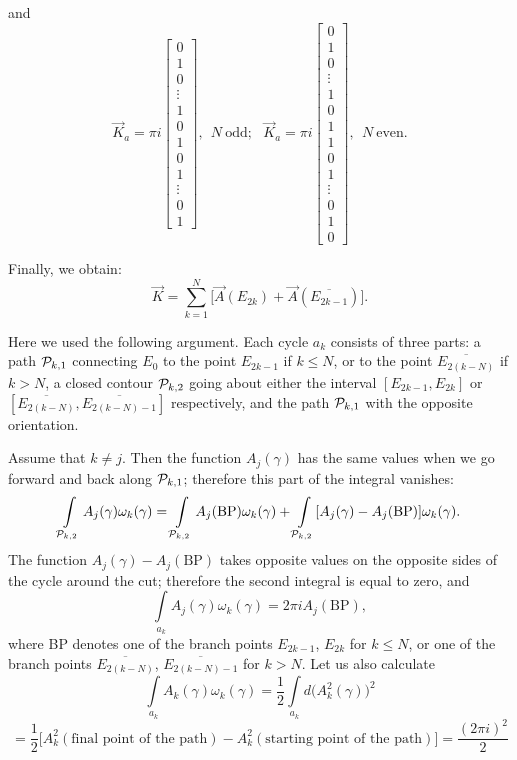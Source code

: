 \documentclass[12pt]{article}
\begin{document}
and
$$
\vec K_a =\pi i\left[\begin{array}{c} 0 \\ 1 \\ 0 \\ \vdots \\ 1 \\ 0 \\ \hline  
1 \\ 0 \\ 1  \\ \vdots\\ 0 \\ 1  \end{array}\right], \ \ 
N \ \mbox{odd}; \ \ \ 
\vec K_a =\pi i \left[\begin{array}{c} 0 \\ 1 \\ 0 \\ \vdots \\ 1 \\ 0 \\ 1 \\ \hline 
1 \\ 0 \\ 1 \\ \vdots \\0 \\ 1 \\ 0 \end{array}\right], \ \ 
N \ \mbox{even}. 
$$

Finally, we obtain:
\begin{equation}
\label{eq:vec_K}
\vec K = \sum\limits_{k=1}^N \big[ \vec A(E_{2k})+  \vec A(\overline{E_{2k-1}})\big].
\end{equation}


Here we used the following argument. Each cycle $a_k$ consists of three parts: a path ${\cal P}_{k,1}$ connecting $E_0$ 
to the point $E_{2k-1}$ if $k\le N$, or to the point $\overline{E_{2(k-N)}}$ if $k>N$, a closed contour ${\cal P}_{k,2}$ 
going about either the interval $[E_{2k-1},E_{2k}]$ or $[\overline{E_{2(k-N)}},\overline{E_{2(k-N)-1}}]$ respectively, and the
path  ${\cal P}_{k,1}$ with the opposite orientation.

Assume that $k\ne j$. Then the function $A_j(\gamma)$ has the same values when we go forward and back along  
${\cal P}_{k,1}$; therefore this part of the integral vanishes: 
$$
\int\limits_{{\cal P}_{k,2}} A_j(\gamma)\omega_k(\gamma) = 
\int\limits_{{\cal P}_{k,2}} A_j(\mbox{BP}) \omega_k(\gamma) + 
\int\limits_{{\cal P}_{k,2}} [ A_j(\gamma)- A_j(\mbox{BP} )] \omega_k(\gamma).
$$
The function $ A_j(\gamma)- A_j(\mbox{BP})$ takes opposite values on the opposite sides of the cycle around the cut; 
therefore the second integral is equal to zero, and
$$
\int\limits_{a_k} A_j(\gamma)\omega_k(\gamma) =2\pi i A_j(\mbox{BP}),
$$
where BP denotes one of the branch points $E_{2k-1}$, $E_{2k}$ for $k\le N$, or one of the branch points 
$\overline{E_{2(k-N)}}$, $\overline{E_{2(k-N)-1}}$ for $k > N$. 
Let us also calculate 
$$
\int\limits_{a_k} A_k(\gamma)\omega_k(\gamma) = \frac{1}{2}\int\limits_{a_k} d\big(A_k^2(\gamma)\big)^2
$$
$$
=\frac{1}{2}\big[A_k^2(\mbox{final point of the path})-A_k^2(\mbox{starting point of the path})  \big]= \frac{(2\pi i)^2}{2}
$$
\end{document}
